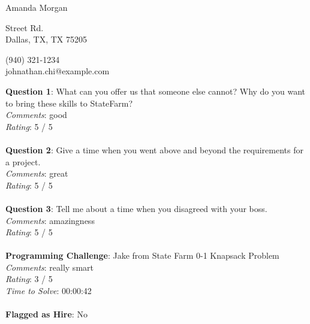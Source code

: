 \documentclass[12pt]{article}
\begin{document}
{\LARGE \begin{center}Amanda Morgan\end{center}}

\begin{multicols}{2}
 Street Rd. \\
Dallas, TX, TX 75205
\columnbreak

\noindent
(940) 321-1234 \\
johnathan.chi@example.com
\end{multicols}

\noindent
\textbf{Question 1}: What can you offer us that someone else cannot? Why do you want to bring these skills to StateFarm?
\\\noindent
\textit{Comments}: good
\\\noindent
\textit{Rating}: 5 / 5
\\\\
\noindent
\textbf{Question 2}: Give a time when you went above and beyond the requirements for a project.
\\\noindent
\textit{Comments}: great
\\\noindent
\textit{Rating}: 5 / 5
\\\\
\noindent
\textbf{Question 3}: Tell me about a time when you disagreed with your boss.
\\\noindent
\textit{Comments}: amazingness
\\\noindent
\textit{Rating}: 5 / 5
\\\\
\noindent
\textbf{Programming Challenge}: Jake from State Farm 0-1 Knapsack Problem
\\\noindent
\textit{Comments}: really smart
\\\noindent
\textit{Rating}: 3 / 5
\\\noindent
\textit{Time to Solve}: 00:00:42
\\\\
\textbf{Flagged as Hire}: No
\\\\ 
\end{document}

